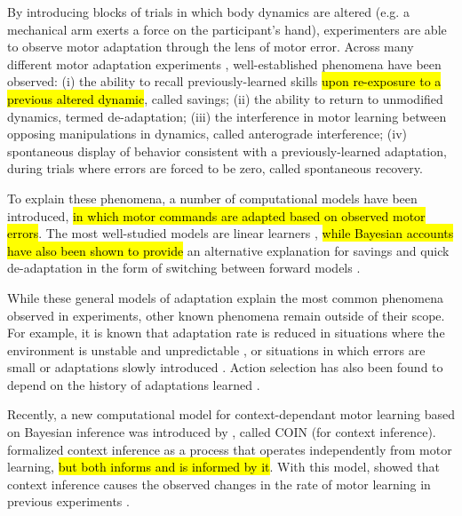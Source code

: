 \documentclass[a4paper,doc,floatsintext,natbib]{apa6}
\DeclareRobustCommand{\newcontent}[1]{\hl{#1}}
\begin{document}
By introducing blocks of trials in which body dynamics are altered (e.g. a mechanical arm exerts a force on the participant's hand), experimenters are able to observe motor adaptation through the lens of motor error. Across many different motor adaptation experiments \citep[e.g.][]{Gandolfo_Motor_1996,Shadmehr_Adaptive_1994,Davidson_Scaling_2004}, well-established phenomena have been observed: (i) the ability to recall previously-learned skills \newcontent{upon re-exposure to a previous altered dynamic}, called savings; (ii) the ability to return to unmodified dynamics, termed de-adaptation; (iii) the interference in motor learning between opposing manipulations in dynamics, called anterograde interference; (iv) spontaneous display of behavior consistent with a previously-learned adaptation, during trials where errors are forced to be zero, called spontaneous recovery.

To explain these phenomena, a number of computational models have been introduced, \newcontent{in which motor commands are adapted based on observed motor errors}. The most well-studied models are linear learners \citep{Smith_Interacting_2006,Forano_Timescales_2020,Scheidt_Learning_2001}, \newcontent{while Bayesian accounts have also been shown to provide} an alternative explanation for savings and quick de-adaptation in the form of switching between forward models \citep{Kording_Bayesian_2004,Oh_Minimizing_2019}.

While these general models of adaptation explain the most common phenomena observed in experiments, other known phenomena remain outside of their scope. For example, it is known that adaptation rate is reduced in situations where the environment is unstable and unpredictable \citep{Herzfeld_memory_2014}, or situations in which errors are small \citep{Marko_Sensitivity_2012} or adaptations slowly introduced \citep{Huang_Persistence_2009}. Action selection has also been found to depend on the history of adaptations learned \citep{Vaswani_Decay_2013,Davidson_Scaling_2004}.

Recently, a new computational model for context-dependant motor learning based on Bayesian inference was introduced by \cite{Heald_Contextual_2021}, called COIN (for context inference). \cite{Heald_Contextual_2021} formalized context inference as a process that operates independently from motor learning, \newcontent{but both informs and is informed by it}. With this model, \cite{Heald_Contextual_2021} showed that context inference causes the observed changes in the rate of motor learning in previous experiments \cite[e.g.][]{Herzfeld_Encoding_2018}.
\end{document}
